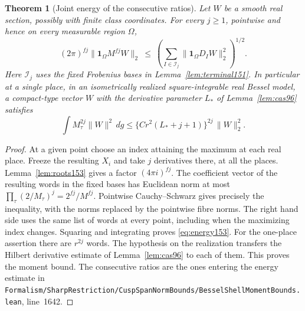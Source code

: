 \documentclass[a4paper,11pt]{article}
\newtheorem{theorem}[proposition]{Theorem}
\theoremstyle{definition}
\theoremstyle{remark}
\newcommand{\srcloc}[2]{{\small\nolinkurl{#1.lean}}, line~#2}
\numberwithin{equation}{section}
\begin{document}
\begin{theorem}[Joint energy of the consecutive ratios]
\label{thm:energy153}
Let \(W\) be a smooth real section, possibly with finite class
coordinates. For every \(j\ge1\), pointwise and hence on every
measurable region \(\Omega\),
\begin{equation}
     (2\pi)^{fj}\|\mathbf1_\Omega M^{fj} W\|_2
       \ \le\
        \left(\sum_{I\in\mathcal I_j}
                   \|\mathbf1_\Omega D_I W\|_2^2\right)^{1/2}.
     \label{eq:energy153}
\end{equation}
Here \(\mathcal I_j\) uses the fixed Frobenius bases in
Lemma~\ref{lem:terminal151}. In particular at a single place,
in an isometrically realized square-integrable real Bessel
model, a compact-type vector \(W\) with the derivative parameter
\(L_*\) of Lemma~\ref{lem:cas96} satisfies
\[
      \int M_\tau^{2j}\|W\|^2\,d\dot g
              \le \{C r^2(L_*+j+1)\}^{2j}\,\|W\|_2^2 .
\]
\end{theorem}
\begin{proof}
At a given point choose an index attaining the maximum at
each real place. Freeze the resulting \(X_i\) and take \(j\)
derivatives there, at all the places. Lemma~\ref{lem:roots153}
gives a factor \((4\pi i)^{fj}\). The coefficient vector of
the resulting words in the fixed bases has Euclidean norm
at most \(\prod_\tau(2/M_\tau)^j=2^{fj}/M^{fj}\).
Pointwise Cauchy--Schwarz gives precisely the inequality,
with the norms replaced by the pointwise fibre norms.
The right hand side uses the same list of words at every
point, including when the maximizing index changes.
Squaring and integrating proves \eqref{eq:energy153}.
For the one-place assertion there are \(r^{2j}\) words.
The hypothesis on the realization transfers the Hilbert
derivative estimate of Lemma~\ref{lem:cas96} to each of them.
This proves the moment bound. The consecutive ratios are the
ones entering the energy estimate in
\srcloc{Formalism/SharpRestriction/CuspSpanNormBounds/BesselShellMomentBounds}{1642}.
\end{proof}
\end{document}
